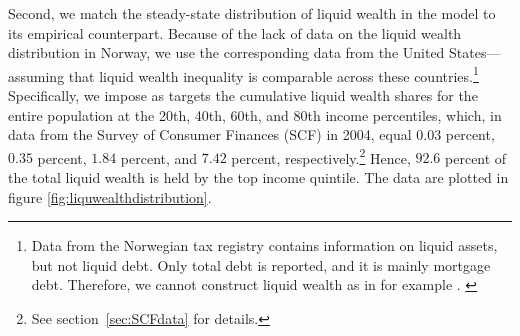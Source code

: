 \documentclass[../HAFiscal]{subfiles}
\begin{document}
Second, we match the steady-state distribution of liquid wealth in the model to its empirical counterpart. Because of the lack of data on the liquid wealth distribution in Norway, we use the corresponding data from the United States---assuming that liquid wealth inequality is comparable across these countries.\footnote{Data from the Norwegian tax registry contains information on liquid assets, but not liquid debt. Only total debt is reported, and it is mainly mortgage debt. Therefore, we cannot construct liquid wealth as in for example \citet{kaplan2014model}. \label{foot:liqwealth}} Specifically, we impose as targets the cumulative liquid wealth shares for the entire population at the 20th, 40th, 60th, and 80th income percentiles, which, in data from the Survey of Consumer Finances (SCF) in 2004, equal $0.03$ percent, $0.35$ percent, $1.84$ percent, and $7.42$ percent, respectively.\footnote{See section~\ref{sec:SCFdata} for details.} Hence, $92.6$ percent of the total liquid wealth is held by the top income quintile. The data are plotted in figure \ref{fig:liquwealthdistribution}.
\end{document}
